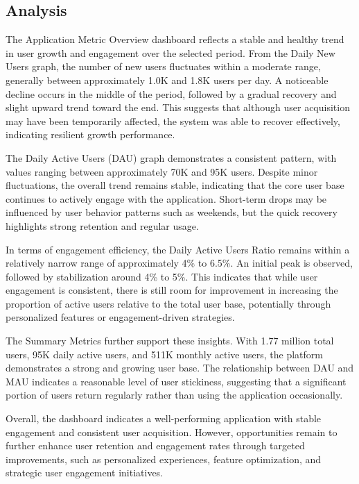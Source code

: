 \documentclass[12pt,oneside,openright,a4paper]{cpe-english-project}
\begin{document}
\subsection{Analysis}

The Application Metric Overview dashboard reflects a stable and healthy
trend in user growth and engagement over the selected period. From the
Daily New Users graph, the number of new users fluctuates within a
moderate range, generally between approximately 1.0K and 1.8K users per
day. A noticeable decline occurs in the middle of the period, followed
by a gradual recovery and slight upward trend toward the end. This
suggests that although user acquisition may have been temporarily
affected, the system was able to recover effectively, indicating
resilient growth performance.

The Daily Active Users (DAU) graph demonstrates a consistent pattern,
with values ranging between approximately 70K and 95K users. Despite
minor fluctuations, the overall trend remains stable, indicating that
the core user base continues to actively engage with the application.
Short-term drops may be influenced by user behavior patterns such as
weekends, but the quick recovery highlights strong retention and regular
usage.

In terms of engagement efficiency, the Daily Active Users Ratio remains
within a relatively narrow range of approximately 4\% to 6.5\%. An
initial peak is observed, followed by stabilization around 4\% to 5\%.
This indicates that while user engagement is consistent, there is still
room for improvement in increasing the proportion of active users
relative to the total user base, potentially through personalized
features or engagement-driven strategies.

The Summary Metrics further support these insights. With 1.77 million
total users, 95K daily active users, and 511K monthly active users, the
platform demonstrates a strong and growing user base. The relationship
between DAU and MAU indicates a reasonable level of user stickiness,
suggesting that a significant portion of users return regularly rather
than using the application occasionally.

Overall, the dashboard indicates a well-performing application with
stable engagement and consistent user acquisition. However,
opportunities remain to further enhance user retention and engagement
rates through targeted improvements, such as personalized experiences,
feature optimization, and strategic user engagement initiatives.
\end{document}
